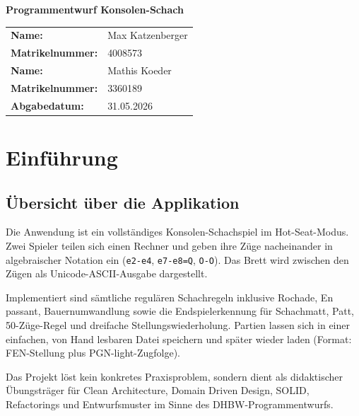 \documentclass[a4paper,12pt]{article}
\let\oldsection\section
\renewcommand{\section}{\clearpage\oldsection}
\begin{document}
\begin{titlepage}
    \centering
    \vspace*{4cm}

    {\LARGE\bfseries Programmentwurf Konsolen-Schach\par}

    \vspace{3cm}

    \begin{tabular}{ll}
        \textbf{Name:}           & Max Katzenberger     \\[0.5em]
        \textbf{Matrikelnummer:} & 4008573              \\[1em]
        \textbf{Name:}           & Mathis Koeder        \\[0.5em]
        \textbf{Matrikelnummer:} & 3360189              \\[1em]
        \textbf{Abgabedatum:}    & 31.05.2026
    \end{tabular}
\end{titlepage}

\section{Einführung}

\subsection*{Übersicht über die Applikation}

Die Anwendung ist ein vollständiges Konsolen-Schachspiel im Hot-Seat-Modus. Zwei Spieler teilen sich
einen Rechner und geben ihre Züge nacheinander in algebraischer Notation ein (\texttt{e2-e4},
\texttt{e7-e8=Q}, \texttt{O-O}). Das Brett wird zwischen den Zügen als Unicode-ASCII-Ausgabe dargestellt.

Implementiert sind sämtliche regulären Schachregeln inklusive Rochade, En passant,
Bauernumwandlung sowie die Endspielerkennung für Schachmatt, Patt, 50-Züge-Regel und dreifache
Stellungswiederholung. Partien lassen sich in einer einfachen, von Hand lesbaren Datei speichern und
später wieder laden (Format: FEN-Stellung plus PGN-light-Zugfolge).

Das Projekt löst kein konkretes Praxisproblem, sondern dient als didaktischer Übungsträger für
Clean Architecture, Domain Driven Design, SOLID, Refactorings und Entwurfsmuster im Sinne des
DHBW-Programmentwurfs.
\end{document}
